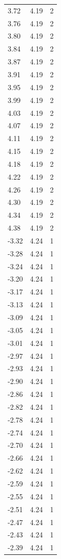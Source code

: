 \begin{longtable}{lrr}
  3.72 & 4.19 & 2 \\
  3.76 & 4.19 & 2 \\
  3.80 & 4.19 & 2 \\
  3.84 & 4.19 & 2 \\
  3.87 & 4.19 & 2 \\
  3.91 & 4.19 & 2 \\
  3.95 & 4.19 & 2 \\
  3.99 & 4.19 & 2 \\
  4.03 & 4.19 & 2 \\
  4.07 & 4.19 & 2 \\
  4.11 & 4.19 & 2 \\
  4.15 & 4.19 & 2 \\
  4.18 & 4.19 & 2 \\
  4.22 & 4.19 & 2 \\
  4.26 & 4.19 & 2 \\
  4.30 & 4.19 & 2 \\
  4.34 & 4.19 & 2 \\
  4.38 & 4.19 & 2 \\
  -3.32 & 4.24 & 1 \\
  -3.28 & 4.24 & 1 \\
  -3.24 & 4.24 & 1 \\
  -3.20 & 4.24 & 1 \\
  -3.17 & 4.24 & 1 \\
  -3.13 & 4.24 & 1 \\
  -3.09 & 4.24 & 1 \\
  -3.05 & 4.24 & 1 \\
  -3.01 & 4.24 & 1 \\
  -2.97 & 4.24 & 1 \\
  -2.93 & 4.24 & 1 \\
  -2.90 & 4.24 & 1 \\
  -2.86 & 4.24 & 1 \\
  -2.82 & 4.24 & 1 \\
  -2.78 & 4.24 & 1 \\
  -2.74 & 4.24 & 1 \\
  -2.70 & 4.24 & 1 \\
  -2.66 & 4.24 & 1 \\
  -2.62 & 4.24 & 1 \\
  -2.59 & 4.24 & 1 \\
  -2.55 & 4.24 & 1 \\
  -2.51 & 4.24 & 1 \\
  -2.47 & 4.24 & 1 \\
  -2.43 & 4.24 & 1 \\
  -2.39 & 4.24 & 1 \\

\end{longtable}
